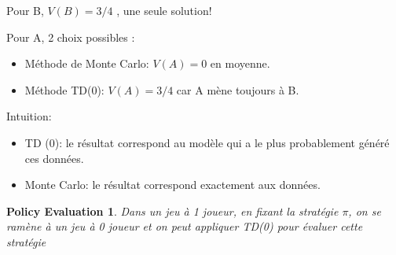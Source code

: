 \documentclass{beamer}	%
\theoremstyle{plain}
\newtheorem{policy}{Policy Evaluation}[section]
\theoremstyle{definition}
\theoremstyle{remark}
\numberwithin{equation}{section}
\begin{document}
\begin{frame}
Pour B, $V(B) = 3/4 $ , une seule solution! 

Pour A, 2 choix possibles : 
\begin{itemize}
	\item Méthode de Monte Carlo: $V(A) = 0 $  en moyenne.
	\item Méthode TD(0): $V(A) = 3/4 $ car A mène toujours à B.
\end{itemize} 

Intuition: 
\begin{itemize}
	\item TD (0): le résultat correspond au modèle qui a le plus probablement généré ces données.
	\item Monte Carlo: le résultat correspond exactement aux données.
\end{itemize} \vspace{0.5cm}

\begin{policy}
Dans un jeu à 1 joueur, en fixant la stratégie $\pi$, on se ramène à un jeu à 0 joueur et on peut appliquer TD(0) pour évaluer cette stratégie
\end{policy}
\end{frame}
\end{document}
